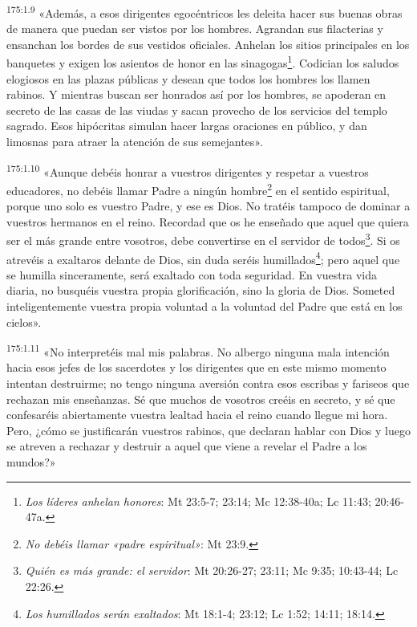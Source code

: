 \par
\textsuperscript{175:1.9} «Además, a esos dirigentes egocéntricos les deleita hacer sus buenas obras de manera que puedan ser vistos por los hombres. Agrandan sus filacterias y ensanchan los bordes de sus vestidos oficiales. Anhelan los sitios principales en los banquetes y exigen los asientos de honor en las sinagogas\footnote{\textit{Los líderes anhelan honores}: Mt 23:5-7; 23:14; Mc 12:38-40a; Lc 11:43; 20:46-47a.}. Codician los saludos elogiosos en las plazas públicas y desean que todos los hombres los llamen rabinos. Y mientras buscan ser honrados así por los hombres, se apoderan en secreto de las casas de las viudas y sacan provecho de los servicios del templo sagrado. Esos hipócritas simulan hacer largas oraciones en público, y dan limosnas para atraer la atención de sus semejantes».

\par
\textsuperscript{175:1.10} «Aunque debéis honrar a vuestros dirigentes y respetar a vuestros educadores, no debéis llamar Padre a ningún hombre\footnote{\textit{No debéis llamar «padre espiritual»}: Mt 23:9.} en el sentido espiritual, porque uno solo es vuestro Padre, y ese es Dios. No tratéis tampoco de dominar a vuestros hermanos en el reino. Recordad que os he enseñado que aquel que quiera ser el más grande entre vosotros, debe convertirse en el servidor de todos\footnote{\textit{Quién es más grande: el servidor}: Mt 20:26-27; 23:11; Mc 9:35; 10:43-44; Lc 22:26.}. Si os atrevéis a exaltaros delante de Dios, sin duda seréis humillados\footnote{\textit{Los humillados serán exaltados}: Mt 18:1-4; 23:12; Lc 1:52; 14:11; 18:14.}; pero aquel que se humilla sinceramente, será exaltado con toda seguridad. En vuestra vida diaria, no busquéis vuestra propia glorificación, sino la gloria de Dios. Someted inteligentemente vuestra propia voluntad a la voluntad del Padre que está en los cielos».

\par
\textsuperscript{175:1.11} «No interpretéis mal mis palabras. No albergo ninguna mala intención hacia esos jefes de los sacerdotes y los dirigentes que en este mismo momento intentan destruirme; no tengo ninguna aversión contra esos escribas y fariseos que rechazan mis enseñanzas. Sé que muchos de vosotros creéis en secreto, y sé que confesaréis abiertamente vuestra lealtad hacia el reino cuando llegue mi hora. Pero, ¿cómo se justificarán vuestros rabinos, que declaran hablar con Dios y luego se atreven a rechazar y destruir a aquel que viene a revelar el Padre a los mundos?»

